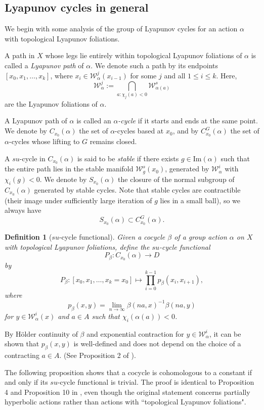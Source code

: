 \documentclass[11pt]{amsart}
\numberwithin{equation}{section}
\newcommand{\W}{\mathcal{W}}
\theoremstyle{plain}
\newtheorem{defi}{Definition}[section]
\begin{document}
\subsection{Lyapunov cycles in general}

We begin with some analysis of the group of Lyapunov cycles for an action $\alpha$ with topological Lyapunov foliations.

A path in $X$ whose legs lie entirely within topological Lyapunov foliations of $\alpha$ is called a \emph{Lyapunov path} of $\alpha$. We denote such a path by its endpoints $[x_0, x_1, \dots, x_k]$, where $x_i \in \W^j_\alpha(x_{i-1})$ for some $j$ and all $1 \le i \le k$. Here, 
\[
\W^j_\alpha := \bigcap_{a: \chi_j(a) < 0} \W^s_{\alpha(a)}
\] 
are the Lyapunov foliations of $\alpha$.

A Lyapunov path of $\alpha$ is called an \emph{$\alpha$-cycle} if it starts and ends at the same point. We denote by $C_{x_0}(\alpha)$ the set of $\alpha$-cycles based at $x_0$, and by $C^G_{x_0}(\alpha)$ the set of $\alpha$-cycles whose lifting to $G$ remains closed.

A $su$-cycle in $C_{x_0}(\alpha)$ is said to be \emph{stable} if there exists $g \in \mathrm{Im}(\alpha)$ such that the entire path lies in the stable manifold $\W^s_g(x_0)$, generated by $\W^i_\alpha$ with $\chi_i(g) < 0$. We denote by $S_{x_0}(\alpha)$ the closure of the normal subgroup of $C_{x_0}(\alpha)$ generated by stable cycles. Note that stable cycles are contractible (their image under sufficiently large iteration of $g$ lies in a small ball), so we always have
\[
S_{x_0}(\alpha) \subset C^G_{x_0}(\alpha).
\]

\begin{defi}[$su$-cycle functional]
Given a cocycle $\beta$ of a group action $\alpha$ on $X$ with topological Lyapunov foliations, define the $su$-cycle functional
\[
P_\beta: C_{x_0}(\alpha) \to D
\]
by
\[
P_\beta: [x_0, x_1, \dots, x_k = x_0] \mapsto \prod_{i=0}^{k-1} p_\beta(x_i, x_{i+1}),
\]
where 
\[
p_\beta(x, y) = \lim_{n \to \infty} \beta(na, x)^{-1} \beta(na, y)
\]
for $y \in \W^i_\alpha(x)$ and $a \in A$ such that $\chi_i(\alpha(a)) < 0$.
\end{defi}

By H\"older continuity of $\beta$ and exponential contraction for $y\in \W^i_\alpha$, it can be shown that $p_\beta(x,y)$ is well-defined and does not depend on the choice of a contracting $a\in A$. (See Proposition 2 of \cite{DK05}).

The following proposition shows that a cocycle is cohomologous to a constant if and only if its $su$-cycle functional is trivial. The proof is identical to Proposition 4 and Proposition 10 in \cite{DK05}, even though the original statement concerns partially hyperbolic actions rather than actions with ``topological Lyapunov foliations".
\end{document}
